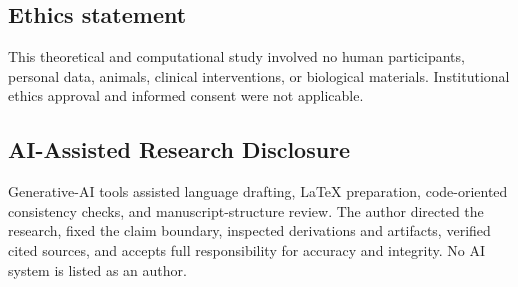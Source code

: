 \documentclass[11pt,a4paper]{article}
\theoremstyle{definition}
\theoremstyle{remark}
\begin{document}
\subsection*{Ethics statement}
This theoretical and computational study involved no human participants, personal data, animals, clinical interventions, or biological materials. Institutional ethics approval and informed consent were not applicable.
\subsection*{AI-Assisted Research Disclosure}
Generative-AI tools assisted language drafting, LaTeX preparation, code-oriented consistency checks, and manuscript-structure review. The author directed the research, fixed the claim boundary, inspected derivations and artifacts, verified cited sources, and accepts full responsibility for accuracy and integrity. No AI system is listed as an author.



\end{document}
